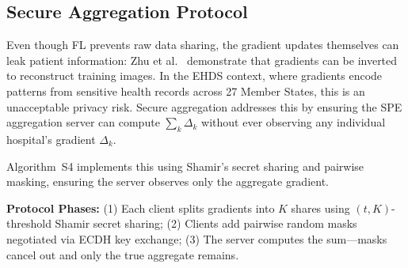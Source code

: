 \documentclass[conference]{IEEEtran}
\begin{document}
\subsection{Secure Aggregation Protocol}

Even though FL prevents raw data sharing, the gradient updates themselves can leak patient information: Zhu et al.~\cite{zhu2019deep} demonstrate that gradients can be inverted to reconstruct training images. In the EHDS context, where gradients encode patterns from sensitive health records across 27 Member States, this is an unacceptable privacy risk. Secure aggregation addresses this by ensuring the SPE aggregation server can compute $\sum_k \Delta_k$ without ever observing any individual hospital's gradient $\Delta_k$.

Algorithm~S4 implements this using Shamir's secret sharing and pairwise masking, ensuring the server observes only the aggregate gradient.

\textbf{Protocol Phases:} (1) Each client splits gradients into $K$ shares using $(t,K)$-threshold Shamir secret sharing; (2) Clients add pairwise random masks negotiated via ECDH key exchange; (3) The server computes the sum---masks cancel out and only the true aggregate remains.

\begin{figure}[htbp]
\centering
{}
\end{figure}
\end{document}
